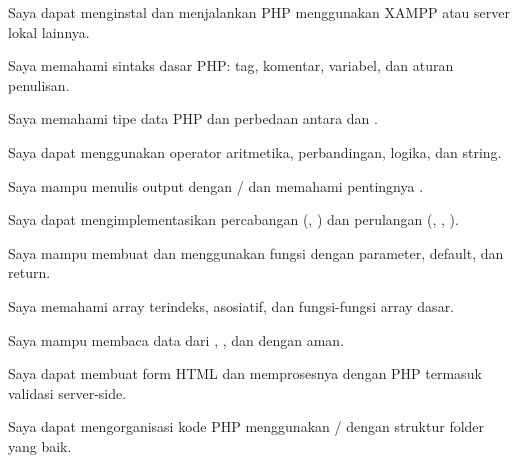 \documentclass[../main.tex]{subfiles}
\begin{document}
\begin{checklist}
  \item Saya dapat menginstal dan menjalankan PHP menggunakan XAMPP atau server lokal lainnya.
  \item Saya memahami sintaks dasar PHP: tag, komentar, variabel, dan aturan penulisan.
  \item Saya memahami tipe data PHP dan perbedaan antara \code{==} dan \code{===}.
  \item Saya dapat menggunakan operator aritmetika, perbandingan, logika, dan string.
  \item Saya mampu menulis output dengan / dan memahami pentingnya .
  \item Saya dapat mengimplementasikan percabangan (, ) dan perulangan (, , ).
  \item Saya mampu membuat dan menggunakan fungsi dengan parameter, default, dan return.
  \item Saya memahami array terindeks, asosiatif, dan fungsi-fungsi array dasar.
  \item Saya mampu membaca data dari , , dan  dengan aman.
  \item Saya dapat membuat form HTML dan memprosesnya dengan PHP termasuk validasi server-side.
  \item Saya dapat mengorganisasi kode PHP menggunakan / dengan struktur folder yang baik.
\end{checklist}
\end{document}
